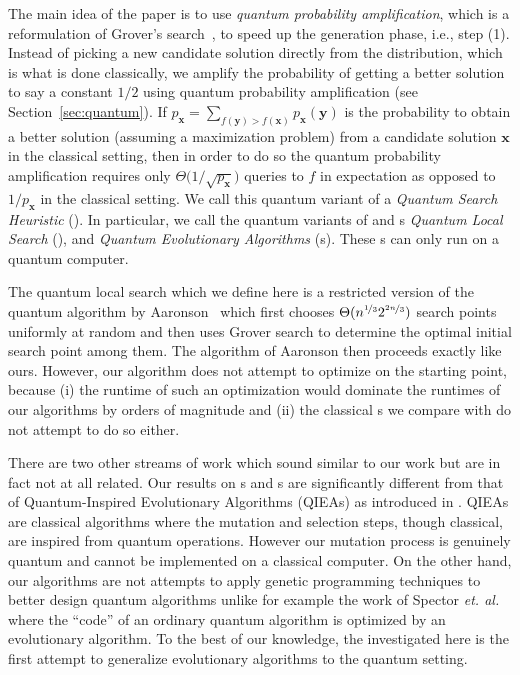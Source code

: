 The main idea of the paper is to use \emph{quantum probability   amplification}, which is a reformulation of Grover's search~\cite{brassard98quantum}, to speed up the generation phase, i.e., step (1). Instead of picking a new candidate solution directly from the distribution, which is what is done classically, we amplify the probability of getting a better solution to say a constant $1/2$ using quantum probability amplification (see Section~\ref{sec:quantum}).  If $p_\mathbf{x} = \sum_{f(\mathbf{y})>   f(\mathbf{x})} p_\mathbf{x}(\mathbf{y})$ is the probability to obtain a better solution (assuming a maximization problem) from a candidate solution $\mathbf{x}$ in the classical setting, then in order to do so the quantum probability amplification requires only $\Theta\big(1/\sqrt{p_{\mathbf{x}}}\big)$ queries to $f$ in expectation as opposed to $1/p_{\mathbf{x}}$ in the classical setting.  We call this quantum variant of \rsh{} a \emph{Quantum Search Heuristic} (\qrsh). In particular, we call the quantum variants of \rls and \ea{}s \emph{Quantum Local Search} (\qrls), and \emph{Quantum Evolutionary   Algorithms} (\qea{}s). These \rsh{}s can only run on a quantum computer.

The quantum local search which we define here is a restricted version of the quantum algorithm by Aaronson~\cite{Aaronson06} which first chooses $\Theta(n^{\nicefrac{1}{3}}2^{\nicefrac{2n}{3}})$ search points uniformly at random and then uses Grover search to determine the optimal initial search point among them. The algorithm of Aaronson then proceeds exactly like ours. However, our algorithm does not attempt to optimize on the starting point, because (i) the runtime of such an optimization would dominate the runtimes of our algorithms by orders of magnitude and (ii) the classical \rsh{}s we compare with do not attempt to do so either.

There are two other streams of work which sound similar to our work but are in fact not at all related. Our results on \qrsh{}s and \qea{}s are significantly different from that of Quantum-Inspired Evolutionary Algorithms (QIEAs) as introduced in \cite{HanK02}. QIEAs are classical algorithms where the mutation and selection steps, though classical, are inspired from quantum operations. However our mutation process is genuinely quantum and cannot be implemented on a classical computer.  On the other hand, our algorithms are not attempts to apply genetic programming techniques to better design quantum algorithms unlike for example the work of Spector \emph{et. al.}~\cite{SpectorBBS99} where the ``code'' of an ordinary quantum algorithm is optimized by an evolutionary algorithm. To the best of our knowledge, the \qooea investigated here is the first attempt to generalize evolutionary algorithms to the quantum setting.

